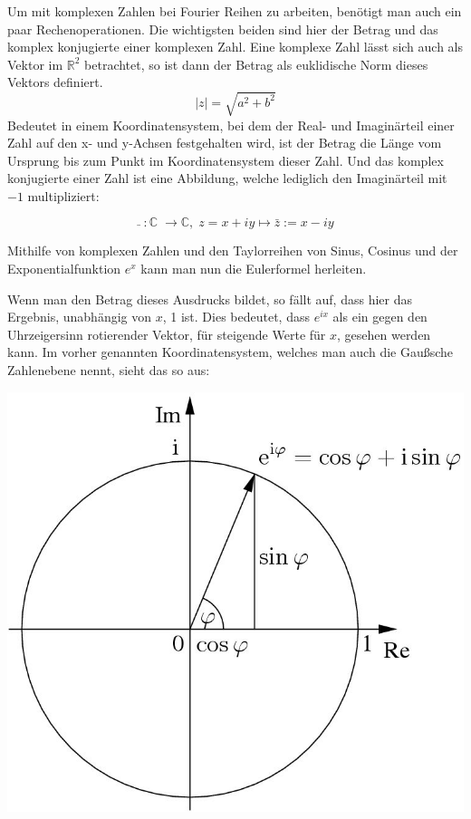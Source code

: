 \documentclass[a4paper,12pt]{article}
\theoremstyle{definition}
\theoremstyle{remark}
\begin{document}
Um mit komplexen Zahlen bei Fourier Reihen zu arbeiten, benötigt man auch ein paar Rechenoperationen. Die wichtigsten beiden sind hier der Betrag und das komplex konjugierte einer komplexen Zahl. Eine komplexe Zahl lässt sich auch als Vektor im $\mathbb{R}^2$ betrachtet, so ist dann der Betrag als euklidische Norm dieses Vektors definiert. 
$$\vert{z}\vert = \sqrt{ a^2 + b^2}$$
Bedeutet in einem Koordinatensystem, bei dem der Real- und Imaginärteil einer Zahl auf den x- und y-Achsen festgehalten wird, ist der Betrag die Länge vom Ursprung bis zum Punkt im Koordinatensystem dieser Zahl. 
Und das komplex konjugierte einer Zahl ist eine Abbildung, welche lediglich den Imaginärteil mit $-1$ multipliziert:

$$\bar{}\;:\mathbb{C}\;\to\mathbb{C},\; z = x+iy \mapsto \bar{z} := x-iy$$

Mithilfe von komplexen Zahlen und den Taylorreihen von Sinus, Cosinus und der Exponentialfunktion $e^x$ kann man nun die Eulerformel herleiten. 


Wenn man den Betrag dieses Ausdrucks bildet, so fällt auf, dass hier das Ergebnis, unabhängig von $x$, 1 ist. Dies bedeutet, dass $e^{ix}$ als ein gegen den Uhrzeigersinn rotierender Vektor, für steigende Werte für $x$, gesehen werden kann. Im vorher genannten Koordinatensystem, welches man auch die Gaußsche Zahlenebene nennt, sieht das so aus:
\begin{center}
\includegraphics[scale=0.75]{eulerformel.jpg}
\end{center}
\end{document}
